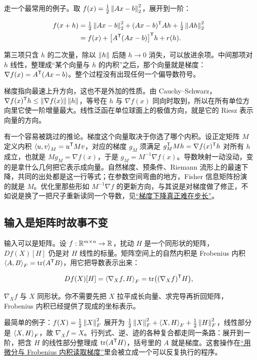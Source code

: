 走一个最常用的例子。取 \(f(x)=\tfrac12\left\lVert Ax-b\right\rVert_2^2\)，展开到一阶：

\[
\begin{aligned}
f(x+h)&=\tfrac12\left\lVert Ax-b\right\rVert_2^2+(Ax-b)^{\mathsf{T}}Ah+\tfrac12\left\lVert Ah\right\rVert_2^2\\
&=f(x)+\bigl[A^{\mathsf{T}}(Ax-b)\bigr]^{\mathsf{T}}h+r(h).
\end{aligned}
\]

第三项只含 \(h\) 的二次量，除以 \(\left\lVert h\right\rVert\) 后随 \(h\to 0\) 消失，可以放进余项。中间那项对 \(h\) 线性，整理成``某个向量与 \(h\) 的内积''之后，那个向量就是梯度：\(\nabla f(x)=A^{\mathsf{T}}(Ax-b)\)。整个过程没有出现任何一个偏导数符号。

梯度指向最速上升方向，这也不是外加的性质。由 Cauchy--Schwarz，\(\nabla f(x)^{\mathsf{T}}h\le\left\lVert\nabla f(x)\right\rVert\left\lVert h\right\rVert\)，等号在 \(h\) 与 \(\nabla f(x)\) 同向时取到，所以在所有单位方向里它使一阶增量最大。线性泛函在单位球面上的极值方向，就是它的 Riesz 表示向量的方向。

有一个容易被跳过的推论。梯度这个向量取决于你选了哪个内积。设正定矩阵 \(M\) 定义内积 \(\left\langle u,v\right\rangle_M=u^{\mathsf{T}}Mv\)，对应的梯度 \(g_M\) 须满足 \(g_M^{\mathsf{T}}Mh=\nabla f(x)^{\mathsf{T}}h\) 对所有 \(h\) 成立，也就是 \(Mg_M=\nabla f(x)\)，于是 \(g_M=M^{-1}\nabla f(x)\)。导数映射一动没动，变的是拿什么几何把它表示成向量。自然梯度、预条件、Riemann 流形上的最速下降，共同的出处都是这一行等式；在参数空间弯曲的地方，Fisher 信息矩阵扮演的就是 \(M\)。优化里那些形如 \(M^{-1}\nabla f\) 的更新方向，与其说是对梯度做了修正，不如说是换了一把尺子重新读同一个导数，见\hyperref[sec:09-Convex-Optimization/06-Optimization-Algorithms/01]{``梯度下降真正难在步长''}。

\subsection{输入是矩阵时故事不变}

输入可以是矩阵。设 \(f:\mathbb{R}^{m\times n}\to\mathbb{R}\)，扰动 \(H\) 是一个同形状的矩阵，\(Df(X)[H]\) 仍是对 \(H\) 线性的标量。矩阵空间上的自然内积是 Frobenius 内积 \(\left\langle A,B\right\rangle_F=\operatorname{tr}(A^{\mathsf{T}}B)\)，用它把导数表示出来：

\[
Df(X)[H]=\left\langle\nabla_X f,H\right\rangle_F=\operatorname{tr}\bigl((\nabla_X f)^{\mathsf{T}}H\bigr),
\]

\(\nabla_X f\) 与 \(X\) 同形状。你不需要先把 \(X\) 拉平成长向量、求完导再折回矩阵，Frobenius 内积已经提供了现成的坐标表示。

最简单的例子：\(f(X)=\tfrac12\left\lVert X\right\rVert_F^2\) 展开为 \(\tfrac12\left\lVert X\right\rVert_F^2+\left\langle X,H\right\rangle_F+\tfrac12\left\lVert H\right\rVert_F^2\)，线性部分是 \(\left\langle X,H\right\rangle_F\)，故 \(\nabla_X f=X\)。行列式、逆、迹的各种复合都走同一条路：展开到一阶，把含 \(H\) 的线性部分整理成 \(\operatorname{tr}(A^{\mathsf{T}}H)\)，括号里的 \(A\) 就是梯度。这套操作在\hyperref[sec:10-Matrix-Calculus/02-Differentials/01]{``用微分与 Frobenius 内积读取梯度''}里会被立成一个可以反复执行的程序。

